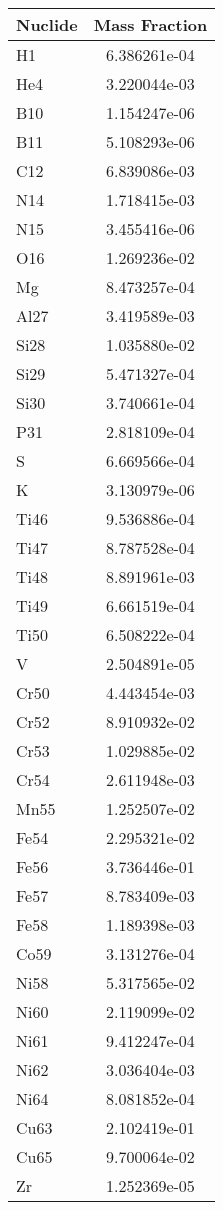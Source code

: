 \begin{centering}
\begin{table}[ht!]
\begin{tabular}{l | c}
\hline
Nuclide & Mass Fraction\\
\hline
H1 & 6.386261e-04\\
He4 & 3.220044e-03\\
B10 & 1.154247e-06\\
B11 & 5.108293e-06\\
C12 & 6.839086e-03\\
N14 & 1.718415e-03\\
N15 & 3.455416e-06\\
O16 & 1.269236e-02\\
Mg & 8.473257e-04\\
Al27 & 3.419589e-03\\
Si28 & 1.035880e-02\\
Si29 & 5.471327e-04\\
Si30 & 3.740661e-04\\
P31 & 2.818109e-04\\
S & 6.669566e-04\\
K & 3.130979e-06\\
Ti46 & 9.536886e-04\\
Ti47 & 8.787528e-04\\
Ti48 & 8.891961e-03\\
Ti49 & 6.661519e-04\\
Ti50 & 6.508222e-04\\
V & 2.504891e-05\\
Cr50 & 4.443454e-03\\
Cr52 & 8.910932e-02\\
Cr53 & 1.029885e-02\\
Cr54 & 2.611948e-03\\
Mn55 & 1.252507e-02\\
Fe54 & 2.295321e-02\\
Fe56 & 3.736446e-01\\
Fe57 & 8.783409e-03\\
Fe58 & 1.189398e-03\\
Co59 & 3.131276e-04\\
Ni58 & 5.317565e-02\\
Ni60 & 2.119099e-02\\
Ni61 & 9.412247e-04\\
Ni62 & 3.036404e-03\\
Ni64 & 8.081852e-04\\
Cu63 & 2.102419e-01\\
Cu65 & 9.700064e-02\\
Zr & 1.252369e-05\\

\end{tabular}
\end{table}
\end{centering}

